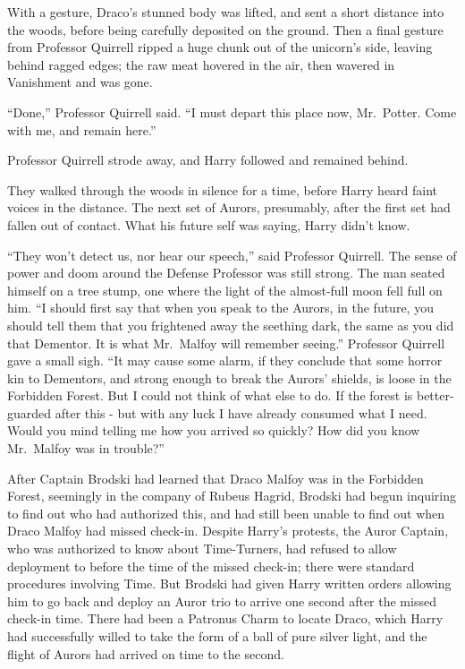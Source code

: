 With a gesture, Draco's stunned body was lifted, and sent a short
distance into the woods, before being carefully deposited on the ground.
Then a final gesture from Professor Quirrell ripped a huge chunk out of
the unicorn's side, leaving behind ragged edges; the raw meat hovered in
the air, then wavered in Vanishment and was gone.

``Done,'' Professor Quirrell said. ``I must depart this place now,
Mr.~Potter. Come with me, and remain here.''

Professor Quirrell strode away, and Harry followed and remained behind.

They walked through the woods in silence for a time, before Harry heard
faint voices in the distance. The next set of Aurors, presumably, after
the first set had fallen out of contact. What his future self was
saying, Harry didn't know.

``They won't detect us, nor hear our speech,'' said Professor Quirrell.
The sense of power and doom around the Defense Professor was still
strong. The man seated himself on a tree stump, one where the light of
the almost-full moon fell full on him. ``I should first say that when
you speak to the Aurors, in the future, you should tell them that you
frightened away the seething dark, the same as you did that Dementor. It
is what Mr.~Malfoy will remember seeing.'' Professor Quirrell gave a
small sigh. ``It may cause some alarm, if they conclude that some horror
kin to Dementors, and strong enough to break the Aurors' shields, is
loose in the Forbidden Forest. But I could not think of what else to do.
If the forest is better-guarded after this - but with any luck I have
already consumed what I need. Would you mind telling me how you arrived
so quickly? How did you know Mr.~Malfoy was in trouble?''

After Captain Brodski had learned that Draco Malfoy was in the Forbidden
Forest, seemingly in the company of Rubeus Hagrid, Brodski had begun
inquiring to find out who had authorized this, and had still been unable
to find out when Draco Malfoy had missed check-in. Despite Harry's
protests, the Auror Captain, who was authorized to know about
Time-Turners, had refused to allow deployment to before the time of the
missed check-in; there were standard procedures involving Time. But
Brodski had given Harry written orders allowing him to go back and
deploy an Auror trio to arrive one second after the missed check-in
time. There had been a Patronus Charm to locate Draco, which Harry had
successfully willed to take the form of a ball of pure silver light, and
the flight of Aurors had arrived on time to the second.

